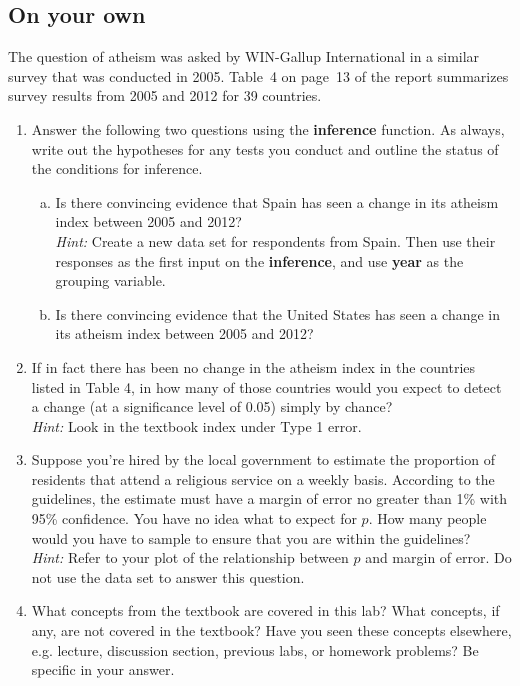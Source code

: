 \documentclass{article}\usepackage[]{graphicx}\usepackage[]{color}
\newcommand{\hlkwd}[1]{\textcolor[rgb]{0.737,0.353,0.396}{\textbf{#1}}}%
\begin{document}
\subsection*{On your own}
The question of atheism was asked by WIN-Gallup International in a similar survey that was conducted in 2005.  Table~4 on page~13 of the report summarizes survey results from 2005 and 2012 for 39 countries.


\begin{enumerate}
\item Answer the following two questions using the \hlkwd{inference} function. As always, write out the hypotheses for any tests you conduct and outline the status of the conditions for inference.
\begin{enumerate}[(a)]
\item Is there convincing evidence that Spain has seen a change in its atheism index between 2005 and 2012? \\
\textit{Hint:} Create a new data set for respondents from Spain. Then use their responses as the first input on the \hlkwd{inference}, and use \hlkwd{year} as the grouping variable.
\item Is there convincing evidence that the United States has seen a change in its atheism index between 2005 and 2012?
\end{enumerate}

\item If in fact there has been no change in the atheism index in the countries listed in Table 4, in how many of those countries would you expect to detect a change (at a significance level of 0.05) simply by chance? \\
\textit{Hint:} Look in the textbook index under Type 1 error.

\item Suppose you're hired by the local government to estimate the proportion of residents that attend a religious service on a weekly basis. According to the guidelines, the estimate must have a margin of error no greater than 1\% with 95\% confidence. You have no idea what to expect for $p$. How many people would you have to sample to ensure that you are within the guidelines?\\
\textit{Hint:} Refer to your plot of the relationship between $p$ and margin of error. Do not use the data set to answer this question.

\item What concepts from the textbook are covered in this lab? What concepts, if any, are not covered in the textbook? Have you seen these concepts elsewhere, e.g. lecture, discussion section, previous labs, or homework problems? Be specific in your answer.
\end{enumerate}
\end{document}
